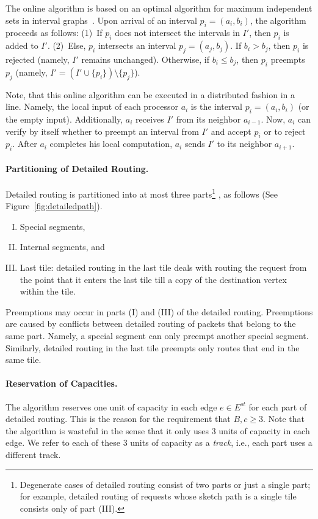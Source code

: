 \documentclass[11pt]{article}
\newenvironment{proof sketch}[1]{\noindent {\emph{Proof sketch of #1:}}}{\hfill \qed}
\begin{document}
    The online algorithm is based on an optimal algorithm for maximum independent
    sets in interval graphs~\cite{GLL}.  Upon arrival of an interval $p_i=(a_i,b_i)$,
    the algorithm proceeds as follows: (1)~If $p_i$ does not intersect the intervals
    in $I'$, then $p_i$ is added to $I'$.  (2)~Else, $p_i$ intersects an interval
    $p_j=(a_j,b_j)$. If $b_i>b_j$, then $p_i$ is rejected (namely, $I'$ remains
    unchanged). Otherwise, if $b_i\leq b_j$, then $p_i$ preempts $p_j$ (namely,
    $I'=(I'\cup\{p_i\}) \setminus \{p_j\}$).

    Note, that this online algorithm can be executed in a distributed fashion in a
    line. Namely, the local input of each processor $a_i$ is the interval $p_i=(a_i,b_i)$ (or the empty input). Additionally, $a_i$ receives  $I'$ from its neighbor $a_{i-1}$. Now, $a_i$ can verify by itself whether to preempt an interval from $I'$ and accept $p_i$ or to reject $p_i$. After $a_i$ completes his local computation, $a_i$ sends $I'$ to its neighbor $a_{i+1}$.



\paragraph{Partitioning of Detailed Routing.}
Detailed routing is partitioned into at most three parts\footnote{Degenerate cases of detailed routing consist of two parts or just a single part; for example, detailed routing of requests whose sketch path is a single tile consists only of part (III).
}
, as follows (See Figure~\ref{fig:detailedpath}).
\begin{enumerate}[(I)]
\item Special segments,
\item Internal segments, and
\item Last tile: detailed routing in the last tile deals with routing the request from the point that it enters the last tile till a copy of the  destination vertex within the tile.
\end{enumerate}
Preemptions may occur in parts (I) and (III) of the detailed routing. Preemptions are caused by conflicts between detailed routing of packets that belong to the same part. Namely, a special segment can only preempt another special segment. Similarly, detailed routing in the last tile preempts only routes that end in the same tile.


\paragraph{Reservation of Capacities.}
The algorithm reserves one unit of capacity in each edge $e\in
E^{st}$ for each part of detailed routing. This is the reason for the requirement that $B,c \geq 3$.
Note that the algorithm is wasteful in the sense that it only uses $3$ units of capacity in each edge.
We refer to each of these $3$ units of capacity as a \emph{track}, i.e., each part uses a different track.
\end{document}
